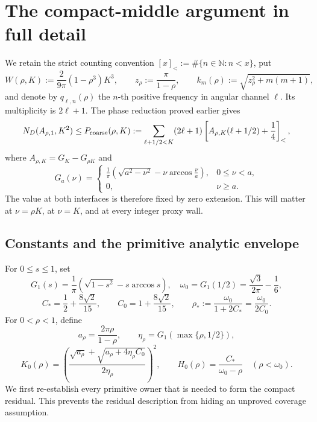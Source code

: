 \documentclass[11pt]{article}
\numberwithin{equation}{section}
\theoremstyle{definition}
\theoremstyle{remark}
\begin{document}
\section{The compact-middle argument in full detail}
\label{cm:sec-full}

We retain the strict counting convention
\([x]_<:=\#\{n\in\mathbb N:n<x\}\), put
\[
 W(\rho,K):=\frac{2}{9\pi}(1-\rho^3)K^3,
 \qquad z_\rho:=\frac{\pi}{1-\rho},
 \qquad k_m(\rho):=\sqrt{z_\rho^2+m(m+1)},
\]
and denote by \(q_{\ell,n}(\rho)\) the \(n\)-th positive frequency in
angular channel \(\ell\).  Its multiplicity is \(2\ell+1\).  The phase
reduction proved earlier gives
\begin{equation}
 N_D(A_{\rho,1},K^2)
 \le P_{\rm coarse}(\rho,K)
 :=\sum_{\ell+1/2<K}(2\ell+1)
 \left[A_{\rho,K}(\ell+1/2)+\frac14\right]_<,
 \label{cm:eq-coarse}
\end{equation}
where \(A_{\rho,K}=G_K-G_{\rho K}\) and
\[
 G_a(\nu)=
 \begin{cases}
 \displaystyle\frac1\pi\left(\sqrt{a^2-\nu^2}
 -\nu\arccos\frac\nu a\right),&0\leq\nu<a,\\[4pt]
 0,&\nu\geq a.
 \end{cases}
\]
The value at both interfaces is therefore fixed by zero extension.  This
will matter at \(\nu=\rho K\), at \(\nu=K\), and at every integer proxy
wall.

\subsection{Constants and the primitive analytic envelope}

For \(0\leq s\leq1\), set
\[
 G_1(s)=\frac1\pi\left(\sqrt{1-s^2}-s\arccos s\right),
 \quad
 \omega_0=G_1(1/2)=\frac{\sqrt3}{2\pi}-\frac16,
\]
\[
 C_*=\frac12+\frac{8\sqrt2}{15},\qquad
 C_0=1+\frac{8\sqrt2}{15},\qquad
 \rho_*:=\frac{\omega_0}{1+2C_*}=\frac{\omega_0}{2C_0}.
\]
For \(0<\rho<1\), define
\[
 a_\rho=\frac{2\pi\rho}{1-\rho},\qquad
 \eta_\rho=G_1\!\left(\max\{\rho,1/2\}\right),
\]
\begin{equation}
 K_0(\rho)=
 \left(
 \frac{\sqrt{a_\rho}+\sqrt{a_\rho+4\eta_\rho C_0}}
 {2\eta_\rho}
 \right)^2,
 \qquad
 H_0(\rho)=\frac{C_*}{\omega_0-\rho}\quad(\rho<\omega_0).
 \label{cm:eq-upper-functions}
\end{equation}
We first re-establish every primitive owner that is needed to form the
compact residual.  This prevents the residual description from hiding an
unproved coverage assumption.
\end{document}
